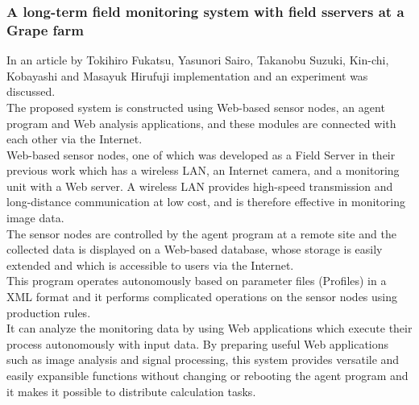 \documentclass[12pt, a4paper]{article}
\begin{document}
\subsubsection{A long-term field monitoring system with field sservers at a Grape farm}
In an article by Tokihiro Fukatsu, Yasunori Sairo, Takanobu Suzuki, Kin-chi, Kobayashi and Masayuk Hirufuji \cite{saito2008long} implementation and an experiment was discussed.\\
The proposed system is constructed using Web-based sensor nodes, an agent program and Web analysis applications, and these modules are connected with each other via the Internet.\\ 
Web-based sensor nodes, one of which was developed as a Field Server in their previous work which has a wireless LAN, an Internet camera, and a monitoring unit with a Web server. A wireless LAN provides high-speed transmission and long-distance communication at low cost, and is therefore effective in monitoring image data.\\
The sensor nodes are controlled by the agent program at a remote site and the collected data is displayed on a Web-based database, whose storage is easily extended and which is accessible to users via the Internet.\\ 
This program operates autonomously based on parameter files (Profiles) in a XML format and it performs complicated operations on the sensor nodes using production rules.\\
It can analyze the monitoring data by using Web applications which execute their process autonomously with input data. By preparing useful Web applications such as image analysis and signal processing, this system provides versatile and easily expansible functions without changing or rebooting the agent program and it makes it possible to distribute calculation tasks.
\end{document}
